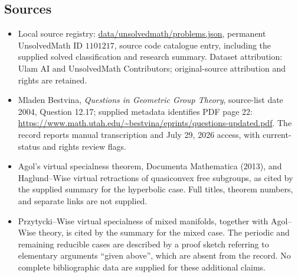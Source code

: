 \documentclass[11pt]{article}
\begin{document}
\subsection{Sources}
\begin{itemize}
\item Local source registry: \url{data/unsolvedmath/problems.json}, permanent UnsolvedMath ID $1101217$, source code catalogue entry, including the supplied solved classification and research summary. Dataset attribution: Ulam AI and UnsolvedMath Contributors; original-source attribution and rights are retained.
\item Mladen Bestvina, \emph{Questions in Geometric Group Theory}, source-list date 2004, Question 12.17; supplied metadata identifies PDF page 22: \url{https://www.math.utah.edu/~bestvina/eprints/questions-updated.pdf}. The record reports manual transcription and July 29, 2026 access, with current-status and rights review flags.
\item Agol's virtual specialness theorem, Documenta Mathematica (2013), and Haglund--Wise virtual retractions of quasiconvex free subgroups, as cited by the supplied summary for the hyperbolic case. Full titles, theorem numbers, and separate links are not supplied.
\item Przytycki--Wise virtual specialness of mixed manifolds, together with Agol--Wise theory, is cited by the summary for the mixed case. The periodic and remaining reducible cases are described by a proof sketch referring to elementary arguments ``given above'', which are absent from the record. No complete bibliographic data are supplied for these additional claims.
\end{itemize}
\end{document}
